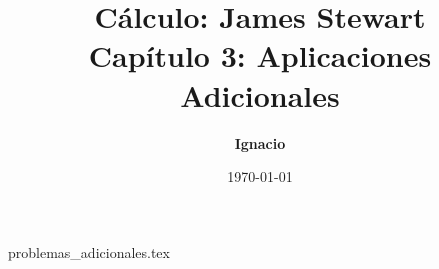 \documentclass[11pt,spanish,oneside]{report}
\title{\textbf{Cálculo: James Stewart} \\ \Large Capítulo 3: Aplicaciones Adicionales}
\author{\textbf{Ignacio}}
\date{\today}
\begin{document}
\maketitle

{problemas_adicionales.tex}
\end{document}
